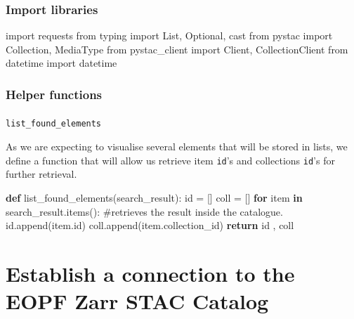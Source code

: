 \documentclass[
  letterpaper,
  DIV=11,
  numbers=noendperiod]{scrreprt}
\makeatletter
\let\oldparagraph\paragraph
\renewcommand{\paragraph}{
    \@ifstar
      \xxxParagraphStar
      \xxxParagraphNoStar
  }
\newcommand{\xxxParagraphStar}[1]{\oldparagraph*{#1}\mbox{}}
\newcommand{\xxxParagraphNoStar}[1]{\oldparagraph{#1}\mbox{}}
\newenvironment{Shaded}{\begin{snugshade}}{\end{snugshade}}
\newcommand{\BuiltInTok}[1]{\textcolor[rgb]{0.00,0.23,0.31}{#1}}
\newcommand{\CommentTok}[1]{\textcolor[rgb]{0.37,0.37,0.37}{#1}}
\newcommand{\ControlFlowTok}[1]{\textcolor[rgb]{0.00,0.23,0.31}{\textbf{#1}}}
\newcommand{\ImportTok}[1]{\textcolor[rgb]{0.00,0.46,0.62}{#1}}
\newcommand{\KeywordTok}[1]{\textcolor[rgb]{0.00,0.23,0.31}{\textbf{#1}}}
\newcommand{\NormalTok}[1]{\textcolor[rgb]{0.00,0.23,0.31}{#1}}
\newcommand{\OperatorTok}[1]{\textcolor[rgb]{0.37,0.37,0.37}{#1}}
\makeatother
\begin{document}
\subsubsection{Import libraries}\label{import-libraries-1}

\begin{Shaded}
\begin{Highlighting}[]
\ImportTok{import}\NormalTok{ requests}
\ImportTok{from}\NormalTok{ typing }\ImportTok{import}\NormalTok{ List, Optional, cast}
\ImportTok{from}\NormalTok{ pystac }\ImportTok{import}\NormalTok{ Collection, MediaType}
\ImportTok{from}\NormalTok{ pystac\_client }\ImportTok{import}\NormalTok{ Client, CollectionClient}
\ImportTok{from}\NormalTok{ datetime }\ImportTok{import}\NormalTok{ datetime}
\end{Highlighting}
\end{Shaded}

\subsubsection{Helper functions}\label{helper-functions-1}

\paragraph{\texorpdfstring{\texttt{list\_found\_elements}}{list\_found\_elements}}\label{list_found_elements}

As we are expecting to visualise several elements that will be stored in
lists, we define a function that will allow us retrieve item
\texttt{id}'s and collections \texttt{id}'s for further retrieval.

\begin{Shaded}
\begin{Highlighting}[]
\KeywordTok{def}\NormalTok{ list\_found\_elements(search\_result):}
    \BuiltInTok{id} \OperatorTok{=}\NormalTok{ []}
\NormalTok{    coll }\OperatorTok{=}\NormalTok{ []}
    \ControlFlowTok{for}\NormalTok{ item }\KeywordTok{in}\NormalTok{ search\_result.items(): }\CommentTok{\#retrieves the result inside the catalogue.}
        \BuiltInTok{id}\NormalTok{.append(item.}\BuiltInTok{id}\NormalTok{)}
\NormalTok{        coll.append(item.collection\_id)}
    \ControlFlowTok{return} \BuiltInTok{id}\NormalTok{ , coll}
\end{Highlighting}
\end{Shaded}

\section{Establish a connection to the EOPF Zarr STAC
Catalog}\label{establish-a-connection-to-the-eopf-zarr-stac-catalog}
\end{document}
